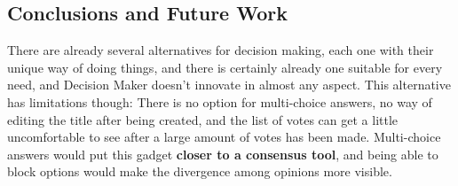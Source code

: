 \subsection{Conclusions and Future Work}
There are already several alternatives for decision making, each one with their unique way of doing things, and there is certainly already one suitable for every need, and Decision Maker doesn't innovate in almost any aspect. This alternative has limitations though: There is no option for multi-choice answers, no way of editing the title after being created, and the list of votes can get a little uncomfortable to see after a large amount of votes has been made. Multi-choice answers would put this gadget \textbf{closer to a consensus tool}, and being able to block options would make the divergence among opinions more visible.
